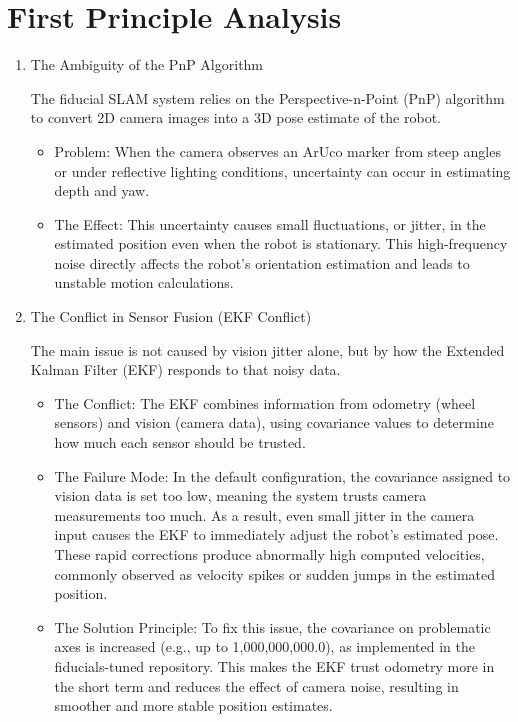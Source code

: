 \documentclass[10pt]{article}
\begin{document}
\section{First Principle Analysis}

\begin{enumerate}
    \item The Ambiguity of the PnP Algorithm

    The fiducial SLAM system relies on the Perspective-n-Point (PnP) algorithm to convert 2D camera images into a 3D pose estimate of the robot.
    \begin{itemize}
        \item Problem: When the camera observes an ArUco marker from steep angles or under reflective lighting conditions, uncertainty can occur in estimating depth and yaw.
        \item The Effect: This uncertainty causes small fluctuations, or jitter, in the estimated position even when the robot is stationary. This high-frequency noise directly affects the robot's orientation estimation and leads to unstable motion calculations.
    \end{itemize}

    \item The Conflict in Sensor Fusion (EKF Conflict)

    The main issue is not caused by vision jitter alone, but by how the Extended Kalman Filter (EKF) responds to that noisy data.
    \begin{itemize}
        \item The Conflict: The EKF combines information from odometry (wheel sensors) and vision (camera data), using covariance values to determine how much each sensor should be trusted.
        \item The Failure Mode: In the default configuration, the covariance assigned to vision data is set too low, meaning the system trusts camera measurements too much. As a result, even small jitter in the camera input causes the EKF to immediately adjust the robot's estimated pose. These rapid corrections produce abnormally high computed velocities, commonly observed as velocity spikes or sudden jumps in the estimated position.
        \item The Solution Principle: To fix this issue, the covariance on problematic axes is increased (e.g., up to 1,000,000,000.0), as implemented in the fiducials-tuned repository. This makes the EKF trust odometry more in the short term and reduces the effect of camera noise, resulting in smoother and more stable position estimates.
    \end{itemize}
\end{enumerate}
\end{document}
